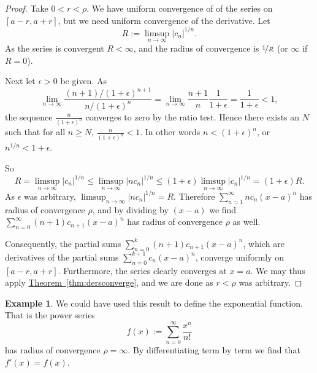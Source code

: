 \documentclass[12pt]{book}
\newcommand{\abs}[1]{\left\lvert {#1} \right\rvert}
\theoremstyle{plain}
\theoremstyle{remark}
\theoremstyle{definition}
\theoremstyle{exercise}
\theoremstyle{example}
\newtheorem{example}[thm]{Example}
\newcommand{\thmref}[1]{\hyperref[#1]{Theorem~\ref*{#1}}}
\begin{document}
\begin{proof}
Take $0 < r < \rho$.
We have uniform convergence of of the series on $[a-r,a+r]$,
but we need uniform convergence of the derivative.
Let
\begin{equation*}
R := \limsup_{n \to \infty} \abs{c_n}^{1/n} .
\end{equation*}
As the series is convergent $R < \infty$, and
the radius of convergence is $\nicefrac{1}{R}$ (or $\infty$ if $R=0$).

Next let $\epsilon > 0$ be given.  As
\begin{equation*}
\lim_{n\to\infty}
\frac{(n+1) / {(1+\epsilon)}^{n+1}}{n / {(1+\epsilon)}^{n}}
=
\lim_{n\to\infty}
\frac{n+1}{n} \frac{1}{1+\epsilon}
=
\frac{1}{1+\epsilon} < 1 ,
\end{equation*}
the sequence $\frac{n}{{(1+\epsilon)}^n}$ converges to zero by the ratio
test.  Hence there exists an $N$ such that for all $n \geq N$,
$\frac{n}{{(1+\epsilon)}^n} < 1$.  In other words
$n < {(1+\epsilon)}^n$, or 
$n^{1/n} < 1+\epsilon$.

So
\begin{equation*}
R = 
\limsup_{n \to \infty}
\abs{c_n}^{1/n}
\leq
\limsup_{n \to \infty}
\abs{n c_n}^{1/n}
\leq
(1+\epsilon)
\limsup_{n \to \infty}
\abs{c_n}^{1/n}
=
(1+\epsilon)R .
\end{equation*}
As $\epsilon$ was arbitrary, $\limsup_{n \to \infty} \abs{n c_n}^{1/n} = R$.
Therefore $\sum_{n=1}^\infty n c_{n} {(x-a)}^{n}$ has radius of
convergence $\rho$, and by dividing by $(x-a)$ we find
$\sum_{n=0}^\infty (n+1) c_{n+1} {(x-a)}^{n}$ has radius of convergence
$\rho$ as well.

Consequently, the partial sums 
$\sum_{n=0}^k (n+1) c_{n+1} {(x-a)}^{n}$,
which are derivatives of the partial sums
$\sum_{n=0}^{k+1} c_{n} {(x-a)}^{n}$,
converge uniformly on $[a-r,a+r]$.  Furthermore,
the series clearly converges at $x=a$.
We may thus apply \thmref{thm:dersconverge}, and
we are done as $r < \rho$ was arbitrary.
\end{proof}

\begin{example}
We could have used this result to define the exponential function.  That is
the power series
\begin{equation*}
f(x) := \sum_{n=0}^\infty \frac{x^n}{n!}
\end{equation*}
has radius of convergence $\rho=\infty$.  By differentiating
term by term we find that $f'(x) = f(x)$.
\end{example}
\end{document}
